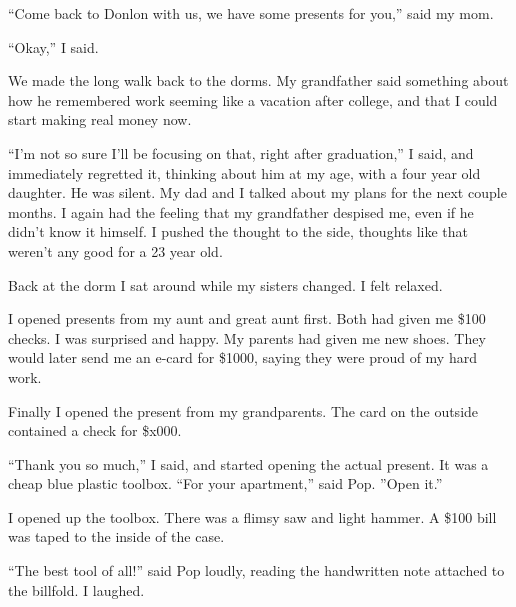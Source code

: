 ``Come back to Donlon with us, we have some presents for you,'' said my mom. 

``Okay,'' I said.  

We made the long walk back to the dorms.  My grandfather said something about
how he remembered work seeming like a vacation after college, and that I could
start making real money now.

``I'm not so sure I'll be focusing on that, right after graduation,'' I said,
and immediately regretted it, thinking about him at my age, with a four year old
daughter.  He was silent.  My dad and I talked about my plans for the next
couple months.  I again had the feeling that my grandfather despised me, even if
he didn't know it himself.  I pushed the thought to the side, thoughts like that
weren't any good for a 23 year old.

Back at the dorm I sat around while my sisters changed.  I felt relaxed.

I opened presents from my aunt and great aunt first.  Both had given me \$100
checks.  I was surprised and happy.  My parents had given me new shoes.  They
would later send me an e-card for \$1000, saying they were proud of my hard
work.  

Finally I opened the present from my grandparents.  The card on the outside
contained a check for \$x000.  

``Thank you so much,'' I said, and started opening the actual present.  It was a
cheap blue plastic toolbox.  ``For your apartment,'' said Pop.  ''Open it.''

I opened up the toolbox.  There was a flimsy saw and light hammer.  A \$100 bill
was taped to the inside of the case.

``The best tool of all!'' said Pop loudly, reading the handwritten note attached
to the billfold.  I laughed.
